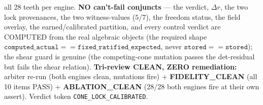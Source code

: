 all 28 teeth per engine. \textbf{NO can't-fail conjuncts} --- the verdict,
\(\Delta r\), the two lock provenances, the two witness-values (\(5\)/\(7\)), the
freedom status, the field overlay, the earned/calibrated partition, and every
control verdict are COMPUTED from the real algebraic objects (the required shape
\(\texttt{computed\_actual}==\texttt{fixed\_ratified\_expected}\), never
\(\texttt{stored}==\texttt{stored}\)); the shear guard is genuine (the
competing-cone mutation passes the det-residual but fails the shear relation).
\textbf{Tri-review CLEAN, ZERO remediation:} arbiter re-run (both engines clean,
mutations fire) \(+\) \textbf{FIDELITY\_CLEAN} (all 10 items PASS) \(+\)
\textbf{ABLATION\_CLEAN} (28/28 both engines fire at their own assert). Verdict
token \texttt{CONE\_LOCK\_CALIBRATED}.
